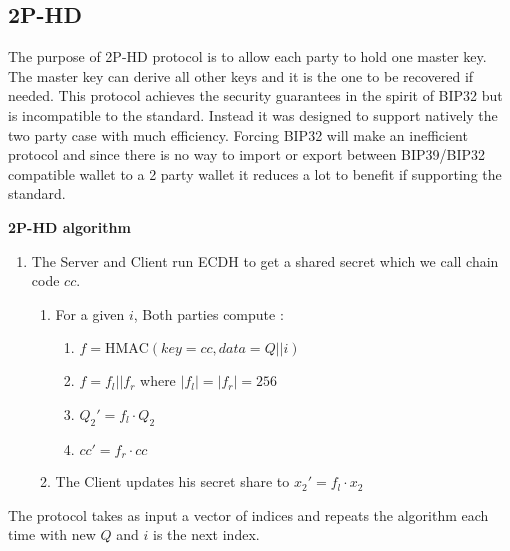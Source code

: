 \documentclass[runningheads]{llncs}
\begin{document}
\subsection{2P-HD}
The purpose of 2P-HD protocol is to allow each party to hold one master key. The master key can derive all other keys and it is the one to be recovered if needed. This protocol achieves the security guarantees in the spirit of BIP32 but is incompatible to the standard. Instead it was designed to support natively the two party case with much efficiency. Forcing BIP32 will make an inefficient protocol and since there is no way to import or export between BIP39/BIP32 compatible wallet to a 2 party wallet it reduces a lot to benefit if supporting the standard.
\begin{mdframed}[userdefinedwidth = 12.3cm]
\textbf{2P-HD algorithm}
\begin{enumerate}
\item The Server and Client run ECDH to get a shared secret which we call chain code $cc$.
\begin{enumerate}
\item For a given $i$, Both parties compute :
\begin{enumerate}
\item ${f = \mathrm{HMAC}(key=cc, data = Q || i )}$
\item ${f=f_l||f_r}$ where ${|f_l|=|f_r|=256}$
\item ${Q_2' = f_l\cdot Q_2}$
\item ${cc' = f_r \cdot cc}$
\end{enumerate}
\item The Client updates his secret share to $x_2' = f_l \cdot x_2$
\end{enumerate}
\end{enumerate}
\end{mdframed}
The protocol takes as input a vector of indices and repeats the algorithm each time with new $Q$ and $i$ is the next index.
\end{document}
